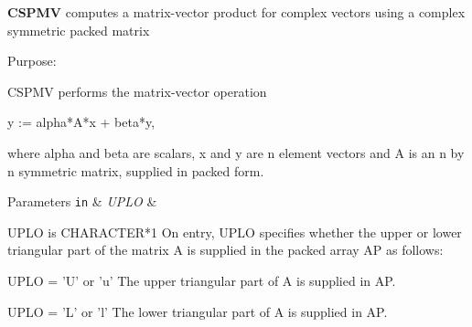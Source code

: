 {\bfseries C\+S\+P\+M\+V} computes a matrix-\/vector product for complex vectors using a complex symmetric packed matrix 

 \begin{DoxyParagraph}{Purpose\+: }
\begin{DoxyVerb} CSPMV  performs the matrix-vector operation

    y := alpha*A*x + beta*y,

 where alpha and beta are scalars, x and y are n element vectors and
 A is an n by n symmetric matrix, supplied in packed form.\end{DoxyVerb}
 
\end{DoxyParagraph}

\begin{DoxyParams}[1]{Parameters}
\mbox{\tt in}  & {\em U\+P\+L\+O} & \begin{DoxyVerb}          UPLO is CHARACTER*1
           On entry, UPLO specifies whether the upper or lower
           triangular part of the matrix A is supplied in the packed
           array AP as follows:

              UPLO = 'U' or 'u'   The upper triangular part of A is
                                  supplied in AP.

              UPLO = 'L' or 'l'   The lower triangular part of A is
                                  supplied in AP.


\end{DoxyVerb}
\end{DoxyParams}

